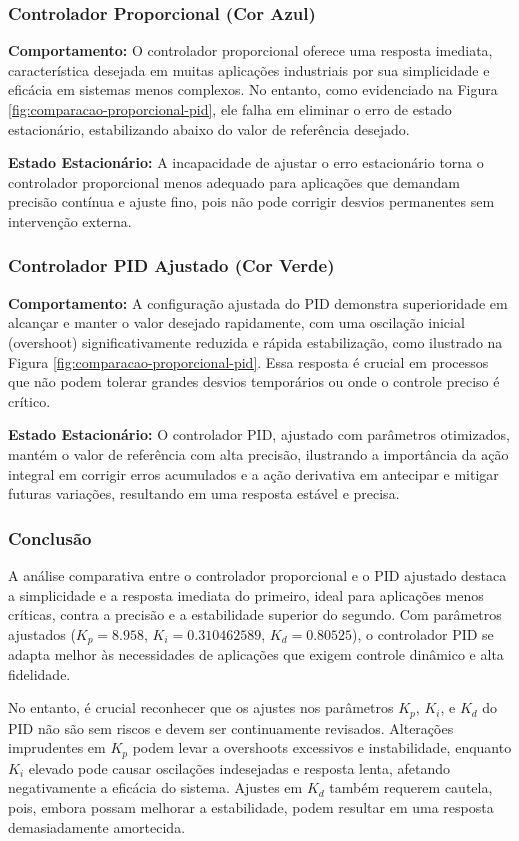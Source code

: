 \subsubsection{Controlador Proporcional (Cor Azul)}
\textbf{Comportamento:}
O controlador proporcional oferece uma resposta imediata, característica desejada em muitas aplicações industriais por sua simplicidade e eficácia em sistemas menos complexos. No entanto, como evidenciado na Figura \ref{fig:comparacao-proporcional-pid}, ele falha em eliminar o erro de estado estacionário, estabilizando abaixo do valor de referência desejado.

\textbf{Estado Estacionário:}
A incapacidade de ajustar o erro estacionário torna o controlador proporcional menos adequado para aplicações que demandam precisão contínua e ajuste fino, pois não pode corrigir desvios permanentes sem intervenção externa.

\subsubsection{Controlador PID Ajustado (Cor Verde)}
\textbf{Comportamento:}
A configuração ajustada do PID demonstra superioridade em alcançar e manter o valor desejado rapidamente, com uma oscilação inicial (overshoot) significativamente reduzida e rápida estabilização, como ilustrado na Figura \ref{fig:comparacao-proporcional-pid}. Essa resposta é crucial em processos que não podem tolerar grandes desvios temporários ou onde o controle preciso é crítico.

\textbf{Estado Estacionário:}
O controlador PID, ajustado com parâmetros otimizados, mantém o valor de referência com alta precisão, ilustrando a importância da ação integral em corrigir erros acumulados e a ação derivativa em antecipar e mitigar futuras variações, resultando em uma resposta estável e precisa.

\subsubsection{Conclusão}
A análise comparativa entre o controlador proporcional e o PID ajustado destaca a simplicidade e a resposta imediata do primeiro, ideal para aplicações menos críticas, contra a precisão e a estabilidade superior do segundo. Com parâmetros ajustados (\(K_p = 8.958\), \(K_i = 0.310462589\), \(K_d = 0.80525\)), o controlador PID se adapta melhor às necessidades de aplicações que exigem controle dinâmico e alta fidelidade.

No entanto, é crucial reconhecer que os ajustes nos parâmetros \(K_p\), \(K_i\), e \(K_d\) do PID não são sem riscos e devem ser continuamente revisados. Alterações imprudentes em \(K_p\) podem levar a overshoots excessivos e instabilidade, enquanto \(K_i\) elevado pode causar oscilações indesejadas e resposta lenta, afetando negativamente a eficácia do sistema. Ajustes em \(K_d\) também requerem cautela, pois, embora possam melhorar a estabilidade, podem resultar em uma resposta demasiadamente amortecida.

